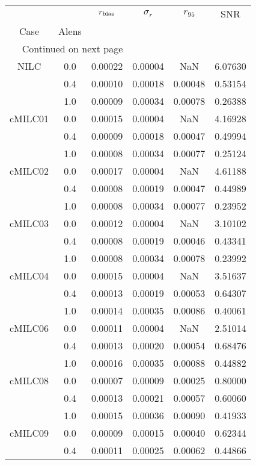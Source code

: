 \begin{longtable}{cccccc}
\toprule
     &     &  $r_{\rm bias}$  &  $\sigma_r$ &  $r_{95}$ &     SNR \\
Case & Alens &                  &             &           &         \\
\midrule
\endhead
\midrule
\multicolumn{3}{r}{{Continued on next page}} \\
\midrule
\endfoot

\bottomrule
\endlastfoot
NILC & 0.0 & 0.00022 & 0.00004 & NaN & 6.07630 \\
     & 0.4 & 0.00010 & 0.00018 & 0.00048 & 0.53154 \\
     & 1.0 & 0.00009 & 0.00034 & 0.00078 & 0.26388 \\
cMILC01 & 0.0 & 0.00015 & 0.00004 & NaN & 4.16928 \\
     & 0.4 & 0.00009 & 0.00018 & 0.00047 & 0.49994 \\
     & 1.0 & 0.00008 & 0.00034 & 0.00077 & 0.25124 \\
cMILC02 & 0.0 & 0.00017 & 0.00004 & NaN & 4.61188 \\
     & 0.4 & 0.00008 & 0.00019 & 0.00047 & 0.44989 \\
     & 1.0 & 0.00008 & 0.00034 & 0.00077 & 0.23952 \\
cMILC03 & 0.0 & 0.00012 & 0.00004 & NaN & 3.10102 \\
     & 0.4 & 0.00008 & 0.00019 & 0.00046 & 0.43341 \\
     & 1.0 & 0.00008 & 0.00034 & 0.00078 & 0.23992 \\
cMILC04 & 0.0 & 0.00015 & 0.00004 & NaN & 3.51637 \\
     & 0.4 & 0.00013 & 0.00019 & 0.00053 & 0.64307 \\
     & 1.0 & 0.00014 & 0.00035 & 0.00086 & 0.40061 \\
cMILC06 & 0.0 & 0.00011 & 0.00004 & NaN & 2.51014 \\
     & 0.4 & 0.00013 & 0.00020 & 0.00054 & 0.68476 \\
     & 1.0 & 0.00016 & 0.00035 & 0.00088 & 0.44882 \\
cMILC08 & 0.0 & 0.00007 & 0.00009 & 0.00025 & 0.80000 \\
     & 0.4 & 0.00013 & 0.00021 & 0.00057 & 0.60060 \\
     & 1.0 & 0.00015 & 0.00036 & 0.00090 & 0.41933 \\
cMILC09 & 0.0 & 0.00009 & 0.00015 & 0.00040 & 0.62344 \\
     & 0.4 & 0.00011 & 0.00025 & 0.00062 & 0.44866 \\

\end{longtable}
